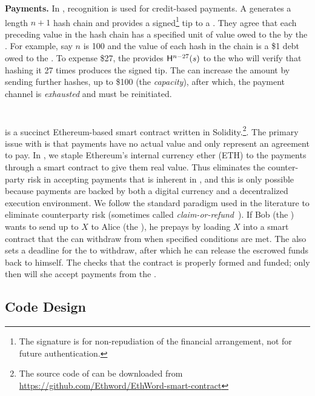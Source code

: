 \textbf{Payments.} In \pw, recognition is used for credit-based payments. A \make generates a length $n+1$ hash chain and provides a signed\footnote{The signature is for non-repudiation of the financial arrangement, not for future authentication.} tip to a \take. They agree that each preceding value in the hash chain has a specified unit of value owed to the \take by the \make. For example, say $n$ is 100 and the value of each hash in the chain is a \$1 debt owed to the \take. To expense \$27, the \make provides $\mathsf{H}^{n-27}(s)$ to the \take who will verify that hashing it 27 times produces the signed tip. The \make can increase the amount by sending further hashes, up to \$100 (the \textit{capacity}), after which, the payment channel is \textit{exhausted} and must be reinitiated.


\section{\ew}

\ew is a succinct Ethereum-based smart contract written in Solidity.\footnote{The source code of \ew can be downloaded from \url{https://github.com/Ethword/EthWord-smart-contract}}. The primary issue with \pw is that payments have no actual value and only represent an agreement to pay. In \ew, we staple Ethereum's internal currency ether (ETH) to the payments through a smart contract to give them real value. Thus \ew eliminates the counter-party risk in accepting payments that is inherent in \pw, and this is only possible because payments are backed by both a digital currency and a decentralized execution environment.
We follow the standard paradigm used in the literature to eliminate counterparty risk (sometimes called \textit{claim-or-refund}~\cite{BK14}). If Bob (the \make) wants to send up to $X$ \eth to Alice (the \take), he prepays by loading $X$ \eth into a smart contract that the \take can withdraw from when specified conditions are met. The \make also sets a deadline for the \take to withdraw, after which he can release the escrowed funds back to himself. The \take checks that the contract is properly formed and funded; only then will she accept payments from the \make.

\subsection{Code Design}



